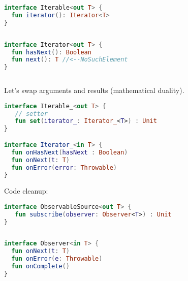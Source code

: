 \documentclass[10pt]{beamer}
\begin{document}
\begin{frame}[fragile]
\begin{lstlisting}[language=Kotlin, basicstyle=\ttfamily]
interface Iterable<out T> {
  fun iterator(): Iterator<T>
}
\end{lstlisting}
\begin{columns}
\begin{column}{0.7\textwidth}
\begin{lstlisting}[language=Kotlin, basicstyle=\ttfamily]
interface Iterator<out T> {
  fun hasNext(): Boolean 
  fun next(): T //<--NoSuchElement
}
\end{lstlisting}
\end{column}
	\begin{column}{0.3\textwidth}
	\end{column}
\end{columns}
\end{frame}

\begin{frame}[fragile]
	Let's swap arguments and results (mathematical duality).
\begin{lstlisting}[language=Kotlin, basicstyle=\ttfamily]
interface Iterable_<out T> {
   // setter 
   fun set(iterator_: Iterator_<T>) : Unit 
}

interface Iterator_<in T> {
  fun onHasNext(hasNext : Boolean)
  fun onNext(t: T)
  fun onError(error: Throwable)
}
\end{lstlisting}
\end{frame}

\begin{frame}[fragile]
Code cleanup:
\begin{lstlisting}[language=Kotlin, basicstyle=\ttfamily]
interface ObservableSource<out T> {
   fun subscribe(observer: Observer<T>) : Unit
}
\end{lstlisting}
\begin{columns}
\begin{column}{0.7\textwidth}
\begin{lstlisting}[language=Kotlin, basicstyle=\ttfamily]
interface Observer<in T> {
  fun onNext(t: T)
  fun onError(e: Throwable)
  fun onComplete()
}
\end{lstlisting}
\end{column}
\begin{column}{0.29\textwidth}
	\end{column}
\end{columns}

\end{frame}
\end{document}
